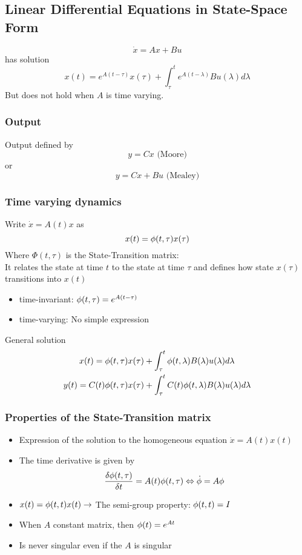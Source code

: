 \subsection{Linear Differential Equations in State-Space Form}%
\label{dls:sub:linear_differential_equations_in_state_space_form}
\[\dot{x} = Ax + Bu\]
has solution 
\[x(t) = e^{A(t - \tau)} x(\tau) + \int_\tau^t e^{A(t - \lambda)} B u(\lambda) d\lambda\]
But does not hold when \(A\) is time varying.

\subsubsection{Output}%
\label{dls:ssub:output}
Output defined by
\[y = Cx \text{ (Moore)} \]
or
\[ y = Cx + Bu \text{ (Mealey)}\]

\subsubsection{Time varying dynamics}%
\label{dls:ssub:time_varying_dynamics}
Write \(\dot{x} = A(t)x\) as
\[x(t) = \phi(t,\tau)x(\tau)\]
Where \(\Phi(t,\tau)\) is the State-Transition matrix:\\
It relates the state at time \(t\) to the state at time \(\tau\) and defines how state \(x(\tau)\) transitions
into \(x(t)\)
\begin{itemize}
\item time-invariant: \(\phi(t,\tau) = e^{A(t-\tau)}\)
\item time-varying: No simple expression
\end{itemize}
General solution
\begin{align*}
  x(t) = \phi(t, \tau)x(\tau) &+ \int_\tau^t \phi(t,\lambda)B(\lambda)u(\lambda)d\lambda\\
  y(t) = C(t)\phi(t, \tau)x(\tau) &+ \int_\tau^t C(t) \phi(t,\lambda)B(\lambda)u(\lambda)d\lambda
\end{align*}

\subsubsection{Properties of the State-Transition matrix}%
\label{dls:ssub:properties_of_the_state_transition_matrix}
\begin{itemize}
\item Expression of the solution to the homogeneous equation \(\dot{x} = A(t)x(t)\)
\item The time derivative is given by \[\frac{\delta\phi(t,\tau)}{\delta t} = A(t)\phi(t,\tau)
    \Leftrightarrow \dot{\phi} = A \phi\]
\item \(x(t) = \phi(t,t) x(t) \rightarrow \) The semi-group property: \(\phi(t,t) = I\)
\item When \(A\) constant matrix, then \(\phi(t) = e^{At}\)
\item Is never singular even if the \(A\) is singular
\end{itemize}

